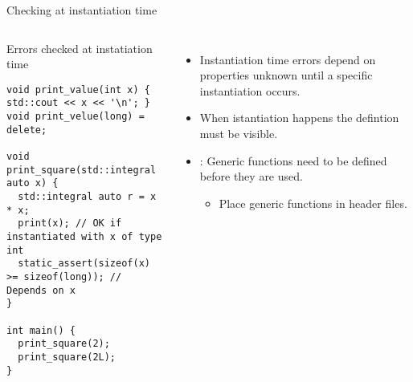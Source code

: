 \begin{frame}[t,fragile]{Checking at instantiation time}

\begin{columns}[T]


\begin{block}{Errors checked at instatiation time}
\begin{lstlisting}
void print_value(int x) { std::cout << x << '\n'; }
void print_velue(long) = delete;

void print_square(std::integral auto x) {
  std::integral auto r = x * x;
  print(x); // OK if instantiated with x of type int
  static_assert(sizeof(x) >= sizeof(long)); // Depends on x
}

int main() {
  print_square(2);
  print_square(2L);
}
\end{lstlisting}
\end{block}


\pause
\begin{itemize}
  \item Instantiation time errors depend on properties unknown until a specific instantiation occurs.

  \item When istantiation happens the defintion must be visible.

  \item {}: Generic functions need to be defined before they are used.
    \begin{itemize}
      \item Place generic functions in header files.
    \end{itemize}
\end{itemize}

\end{columns}

\end{frame}

